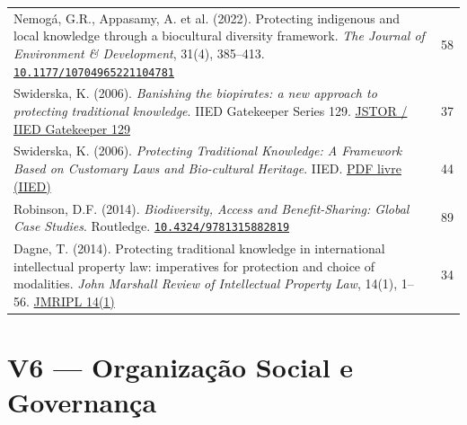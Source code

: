 \documentclass[a4paper,11pt]{article}
\newcommand{\doi}[1]{\href{https://doi.org/#1}{\texttt{#1}}}
\begin{document}
\begin{longtable}{>{\raggedright\arraybackslash}p{} c}
Nemogá, G.R., Appasamy, A. et al. (2022). Protecting indigenous and local knowledge through a biocultural diversity framework. \textit{The Journal of Environment \& Development}, 31(4), 385--413.\newline
\doi{10.1177/10704965221104781} & 58 \\
\addlinespace

Swiderska, K. (2006). \textit{Banishing the biopirates: a new approach to protecting traditional knowledge}. IIED Gatekeeper Series 129.\newline
\href{https://www.jstor.org/stable/resrep01338}{JSTOR / IIED Gatekeeper 129} & 37 \\
\addlinespace

Swiderska, K. (2006). \textit{Protecting Traditional Knowledge: A Framework Based on Customary Laws and Bio-cultural Heritage}. IIED.\newline
\href{https://www.iied.org/sites/default/files/pdfs/migrate/G01069.pdf}{PDF livre (IIED)} & 44 \\
\addlinespace

Robinson, D.F. (2014). \textit{Biodiversity, Access and Benefit-Sharing: Global Case Studies}. Routledge.\newline
\doi{10.4324/9781315882819} & 89 \\
\addlinespace

Dagne, T. (2014). Protecting traditional knowledge in international intellectual property law: imperatives for protection and choice of modalities. \textit{John Marshall Review of Intellectual Property Law}, 14(1), 1--56.\newline
\href{https://repository.law.uic.edu/ripl/vol14/iss1/1/}{JMRIPL 14(1)} & 34 \\

\bottomrule
\end{longtable}

\section{V6 --- Organização Social e Governança}
\end{document}
